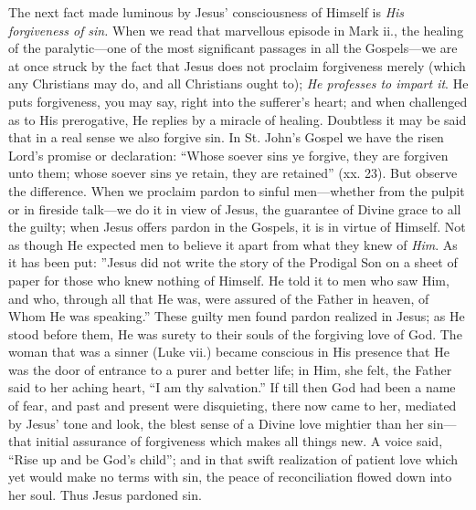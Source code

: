 \documentclass[12pt,a5paper,oneside]{book}
\begin{document}
The next fact made luminous by Jesus'
consciousness of Himself is \textit{His forgiveness of}
\textit{sin.} When we read that marvellous episode
in Mark ii., the healing of the paralytic---one
of the most significant passages in all the
Gospels---we are at once struck by the
fact that Jesus does not proclaim forgiveness
merely (which any Christians may do, and all
Christians ought to); \textit{He professes to impart it}.
He puts forgiveness, you may say, right into
the sufferer's heart; and when challenged as
to His prerogative, He replies by a miracle of
healing. Doubtless it may be said that in a
real sense we also forgive sin. In St. John's
Gospel we have the risen Lord's promise
or declaration: ``Whose soever sins ye forgive,
they are forgiven unto them; whose soever
sins ye retain, they are retained'' (xx. 23).
But observe the difference. When we proclaim 
pardon to sinful men---whether from the
pulpit or in fireside talk---we do it in view of
Jesus, the guarantee of Divine grace to all
the guilty; when Jesus offers pardon in the
Gospels, it is in virtue of Himself. Not as
though He expected men to believe it apart from
what they knew of \textit{Him}. As it has been put:
''Jesus did not write the story of the Prodigal
Son on a sheet of paper for those who knew
nothing of Himself. He told it to men who
saw Him, and who, through all that He was,
were assured of the Father in heaven, of
Whom He was speaking.'' These guilty men
found pardon realized in Jesus; as He stood
before them, He was surety to their souls of
the forgiving love of God. The woman that
was a sinner (Luke vii.) became conscious in
His presence that He was the door of entrance
to a purer and better life; in Him, she felt,
the Father said to her aching heart, ``I am
thy salvation.'' If till then God had been a
name of fear, and past and present were disquieting, 
there now came to her, mediated by
Jesus' tone and look, the blest sense of a Divine
love mightier than her sin---that initial assurance
of forgiveness which makes all things new. A
voice said, ``Rise up and be God's child'';
and in that swift realization of patient love
which yet would make no terms with sin, the
peace of reconciliation flowed down into her
soul. Thus Jesus pardoned sin.
\end{document}
